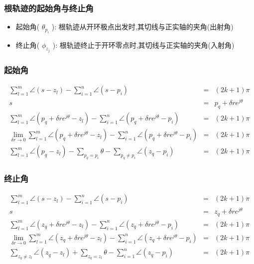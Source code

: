 \documentclass{beamer}
\begin{document}
\begin{frame}
\frametitle{根轨迹的起始角与终止角}
\label{sec-1-7}

\begin{itemize}
\item 起始角( $\theta_{p_i}$ ): 根轨迹从开环极点出发时,其切线与正实轴的夹角(出射角)
\item 终止角( $\phi_{z_j}$ ): 根轨迹终止于开环零点时,其切线与正实轴的夹角(入射角)
\end{itemize}
\end{frame}
\begin{frame}
\frametitle{起始角}
\label{sec-1-8}

\begin{eqnarray*}
\sum_{l=1}^{m}\angle(s-z_{l})-\sum_{i=1}^{n}\angle(s-p_{i}) & = & (2k+1)\pi\\
s & = & p_{q}+\delta re^{j\theta}\\
\sum_{l=1}^{m}\angle(p_{q}+\delta re^{j\theta}-z_{l})-\sum_{i=1}^{n}\angle(p_{q}+\delta re^{j\theta}-p_{i}) & = & (2k+1)\pi\\
\lim_{\delta r\rightarrow0}\sum_{l=1}^{m}\angle(p_{q}+\delta re^{j\theta}-z_{l})-\sum_{i=1}^{n}\angle(p_{q}+\delta re^{j\theta}-p_{i}) & = & (2k+1)\pi\\
\sum_{l=1}^{m}\angle(p_{q}-z_{l})-\sum_{p_{q}=p_{i}}\theta-\sum_{p_{q}\not=p_{i}}\angle(z_{q}-p_{i}) & = & (2k+1)\pi
\end{eqnarray*}
\end{frame}
\begin{frame}
\frametitle{终止角}
\label{sec-1-9}

\begin{eqnarray*}
\sum_{l=1}^{m}\angle(s-z_{l})-\sum_{i=1}^{n}\angle(s-p_{i}) & = & (2k+1)\pi\\
s & = & z_{q}+\delta re^{j\theta}\\
\sum_{l=1}^{m}\angle(z_{q}+\delta re^{j\theta}-z_{l})-\sum_{i=1}^{n}\angle(z_{q}+\delta re^{j\theta}-p_{i}) & = & (2k+1)\pi\\
\lim_{\delta r\rightarrow0}\sum_{l=1}^{m}\angle(z_{q}+\delta re^{j\theta}-z_{l})-\sum_{i=1}^{n}\angle(z_{q}+\delta re^{j\theta}-p_{i}) & = & (2k+1)\pi\\
\sum_{z_{q}\not=z_{l}}\angle(z_{q}-z_{l})+\sum_{z_{q}=z_{l}}\theta-\sum_{i=1}^{n}\angle(z_{q}-p_{i}) & = & (2k+1)\pi
\end{eqnarray*}
\end{frame}
\end{document}

